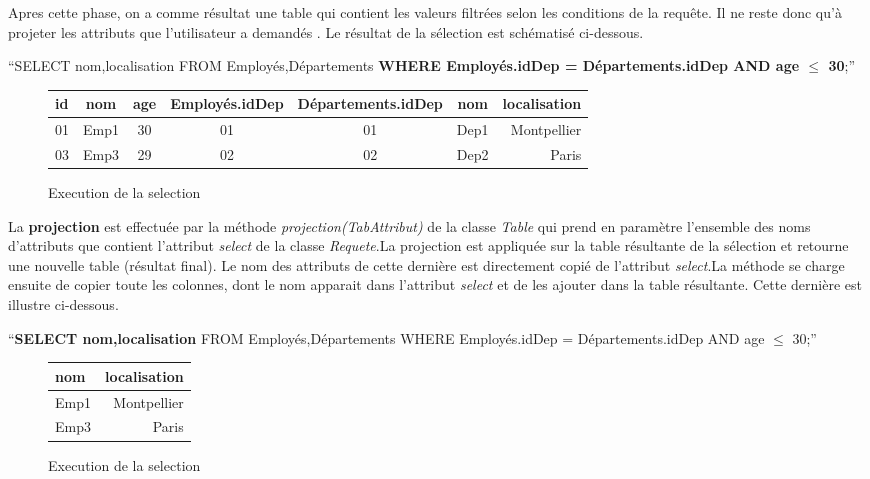 \documentclass[oneside,13pt,a4paper]{report}
\begin{document}
Apres cette phase, on a comme résultat une table qui contient les valeurs filtrées selon les conditions de la requête. Il ne reste donc qu'à projeter les attributs que l'utilisateur a demandés . Le résultat de la sélection est schématisé ci-dessous.

\begin{center}
	\enquote{SELECT nom,localisation FROM Employés,Départements \textbf{WHERE Employés.idDep = Départements.idDep AND age $\leq$ 30};}
	\begin{figure}[h]
		\centering
		\caption{Execution de la selection}
		\begin{tabular}{|l|c|c|c|c|c|r|}
			\hline
			id & nom  & age & Employés.idDep & Départements.idDep & nom  & localisation
			\\
			\hline
			01 & Emp1 & 30  & 01 & 01 & Dep1 & Montpellier  \\
			03 & Emp3 & 29  & 02 & 02 & Dep2 & Paris        \\
			\hline
		\end{tabular}
	\end{figure}
\end{center}

La \textbf{projection} est effectuée par la méthode \textit{projection(TabAttribut)} de la classe \textit{Table} qui prend en paramètre l'ensemble des noms d'attributs que contient l'attribut \textit{select} de la classe \textit{Requete}.La projection est appliquée sur la table résultante de la sélection et retourne une nouvelle table (résultat final). Le nom des attributs de cette dernière est directement copié de l'attribut \textit{select}.La méthode se charge ensuite de copier toute les colonnes, dont le nom apparait dans l'attribut \textit{select} et de les ajouter dans la table résultante. Cette dernière est illustre ci-dessous.

\begin{center}
	\enquote{\textbf{SELECT nom,localisation} FROM Employés,Départements WHERE Employés.idDep = Départements.idDep AND age $\leq$ 30;}
	\begin{figure}[h]
		\centering
		\caption{Execution de la selection}
		\begin{tabular}{|l|r|}
			\hline
			nom  & localisation
			\\
			\hline
			Emp1 & Montpellier  \\
			Emp3 & Paris        \\
			\hline
		\end{tabular}
	\end{figure}
\end{center}
\end{document}
